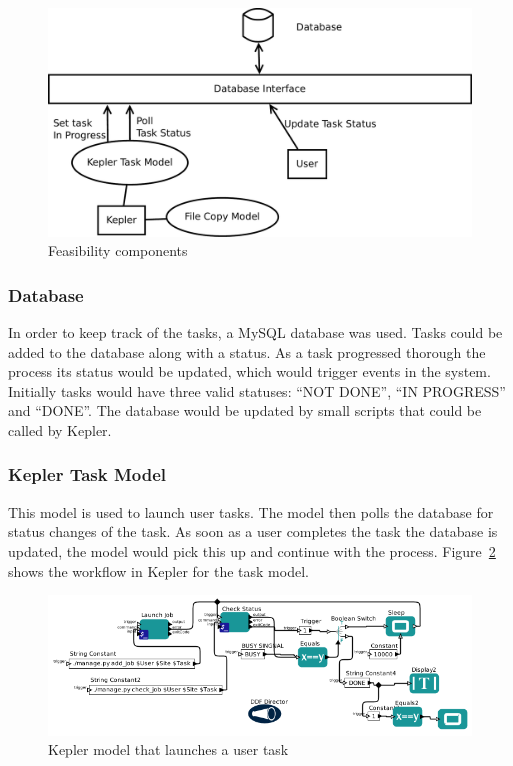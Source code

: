 \documentclass[12pt,a4paper]{report}
\begin{document}
\begin{figure}[!h]
    \begin{center}
        \includegraphics[scale=0.35]{figures/iter1_impl.pdf}
    \end{center}
    \caption{Feasibility components}
    \label{iter1_overview}
\end{figure}

\subsubsection{Database}
In order to keep track of the tasks, a MySQL database was used. Tasks could be added
to the database along with a status. As a task progressed thorough the process its
status would be updated, which would trigger events in the system. Initially tasks would
have three valid statuses: ``NOT DONE'', ``IN PROGRESS'' and ``DONE''. The database would
be updated by small scripts that could be called by Kepler.

\subsubsection{Kepler Task Model}

This model is used to launch user tasks. The model then polls the database for
status changes of the task. As soon as a user completes the task the
database is updated, the model would pick this up and continue with the process.
Figure~\ref{kepler_task_model} shows the workflow in Kepler for the task model.

\begin{figure}[!h]
    \begin{center}
        \includegraphics[scale=0.6]{figures/task_model_kepler.png}
    \end{center}
    \caption{Kepler model that launches a user task}
    \label{kepler_task_model}
\end{figure}
\end{document}
